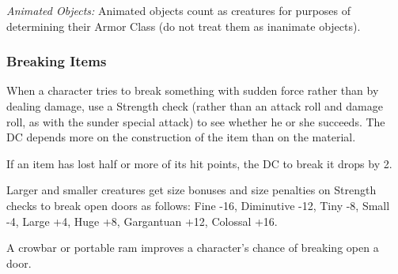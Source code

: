 \textit{Animated Objects:} Animated objects count as creatures for purposes of determining their Armor Class (do not treat them as inanimate objects).

\subsubsection{Breaking Items}
When a character tries to break something with sudden force rather than by dealing damage, use a Strength check (rather than an attack roll and damage roll, as with the sunder special attack) to see whether he or she succeeds. The DC depends more on the construction of the item than on the material.

If an item has lost half or more of its hit points, the DC to break it drops by 2.

Larger and smaller creatures get size bonuses and size penalties on Strength checks to break open doors as follows: Fine -16, Diminutive -12, Tiny -8, Small -4, Large +4, Huge +8, Gargantuan +12, Colossal +16.

A crowbar or portable ram improves a character's chance of breaking open a door.

